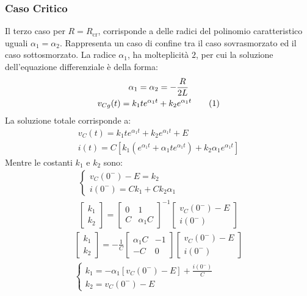 \documentclass{article}
\newcommand{\tageq}{\tag{\stepcounter{equation}\theequation}}
\numberwithin{equation}{subsection}
\begin{document}
\subsubsection{Caso Critico}
Il terzo caso per $R=R_{\mathrm{cr}}$, corrisponde a delle radici del polinomio caratteristico uguali $\alpha_1=\alpha_2$. Rappresenta un caso di confine tra il caso 
sovrasmorzato ed il caso sottosmorzato. La radice $\alpha_1$, ha molteplicità $2$, per cui 
la soluzione dell'equazione differenziale è della forma:
\begin{gather*}
    \alpha_1=\alpha_2=\displaystyle-\frac{R}{2L}\\
    v_{Cg}(t)=k_1te^{\alpha_1t}+k_2e^{\alpha_1t}\tageq
\end{gather*}
La soluzione totale corrisponde a:
\begin{gather*}
    v_C(t)=k_1te^{\alpha_1t}+k_2e^{\alpha_1t}+E\\
    i(t)=C\left[k_1(e^{\alpha_1t}+\alpha_1te^{\alpha_1t})+k_2\alpha_1e^{\alpha_1t}\right]
\end{gather*}
Mentre le costanti $k_1$ e $k_2$ sono:
\begin{gather*}
    \begin{cases}
        v_C(0^-)-E=k_2\\
        i(0^-)=Ck_1+Ck_2\alpha_1
    \end{cases}\\
    \begin{bmatrix}
        k_1\\k_2
    \end{bmatrix}=\begin{bmatrix}
        0&1\\C&\alpha_1C
    \end{bmatrix}^{-1}\begin{bmatrix}
        v_C(0^-)-E\\i(0^-)
    \end{bmatrix}
\end{gather*}
\begin{gather*}
    \begin{bmatrix}
        k_1\\k_2
    \end{bmatrix}=\displaystyle-\frac{1}{C}\begin{bmatrix}
        \alpha_1C&-1\\-C&0
    \end{bmatrix}\begin{bmatrix}
        v_C(0^-)-E\\i(0^-)
    \end{bmatrix}\\
    \begin{cases}
        k_1=-\alpha_1[v_C(0^-)-E]+\displaystyle\frac{i(0^-)}{C}\\
        k_2=v_C(0^-)-E
    \end{cases}
\end{gather*}
\end{document}
